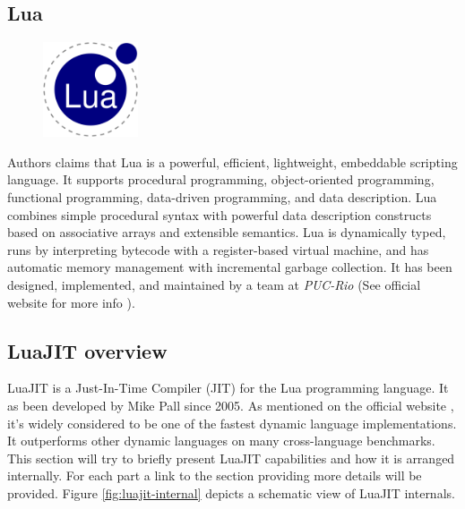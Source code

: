 


\subsection{Lua}
\label{Subsec:Lua}

\begin{figure}
    \centering
	\includegraphics[width=0.25\textwidth]{./Images/Lua.eps}
    \label{fig:lua-logo}
\end{figure}

Authors claims that Lua is a powerful, efficient, lightweight, embeddable
scripting language. It supports procedural programming, object-oriented
programming, functional programming, data-driven programming, and data
description. Lua combines simple procedural syntax with powerful data description
constructs based on associative arrays and extensible semantics. Lua is
dynamically typed, runs by interpreting bytecode with a register-based virtual
machine, and has automatic memory management with incremental garbage collection.
It has been designed, implemented, and maintained by a team at \emph{PUC-Rio}
(See official website for more info \cite{lua}).


\subsection{LuaJIT overview}
\label{Subsec:LuaJIT-overview}

LuaJIT is a Just-In-Time Compiler (JIT) for the Lua programming language. It as
been developed by Mike Pall since 2005. As mentioned on the official website
\cite{luajit-site}, it's widely considered to be one of the fastest dynamic
language implementations. It outperforms other dynamic languages on many
cross-language benchmarks. This section will try to briefly present LuaJIT
capabilities and how it is arranged internally. For each part a link to the
section providing more details will be provided. Figure \ref{fig:luajit-internal}
depicts a schematic view of LuaJIT internals.

